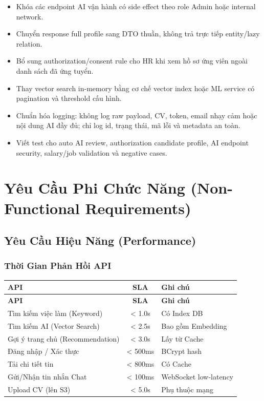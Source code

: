 \documentclass[12pt, a4paper]{report}
\begin{document}
\begin{itemize}
    \item Khóa các endpoint AI vận hành có side effect theo role Admin hoặc internal network.
    \item Chuyển response full profile sang DTO thuần, không trả trực tiếp entity/lazy relation.
    \item Bổ sung authorization/consent rule cho HR khi xem hồ sơ ứng viên ngoài danh sách đã ứng tuyển.
    \item Thay vector search in-memory bằng cơ chế vector index hoặc ML service có pagination và threshold cấu hình.
    \item Chuẩn hóa logging: không log raw payload, CV, token, email nhạy cảm hoặc nội dung AI đầy đủ; chỉ log id, trạng thái, mã lỗi và metadata an toàn.
    \item Viết test cho auto AI review, authorization candidate profile, AI endpoint security, salary/job validation và negative cases.
\end{itemize}

\chapter{Yêu Cầu Phi Chức Năng (Non-Functional Requirements)}

\section{Yêu Cầu Hiệu Năng (Performance)}

\subsection{Thời Gian Phản Hồi API}

\begin{longtable}{|p{6cm}|c|p{5cm}|}
\hline
\textbf{API} & \textbf{SLA} & \textbf{Ghi chú} \\
\hline
\endfirsthead
\hline
\textbf{API} & \textbf{SLA} & \textbf{Ghi chú} \\
\hline
\endhead
Tìm kiếm việc làm (Keyword) & < 1.0s & Có Index DB \\
\hline
Tìm kiếm AI (Vector Search) & < 2.5s & Bao gồm Embedding \\
\hline
Gợi ý trang chủ (Recommendation) & < 3.0s & Lấy từ Cache \\
\hline
Đăng nhập / Xác thực & < 500ms & BCrypt hash \\
\hline
Tải chi tiết tin & < 800ms & Có Cache \\
\hline
Gửi/Nhận tin nhắn Chat & < 100ms & WebSocket low-latency \\
\hline
Upload CV (lên S3) & < 5.0s & Phụ thuộc mạng \\
\hline
\end{longtable}
\end{document}
